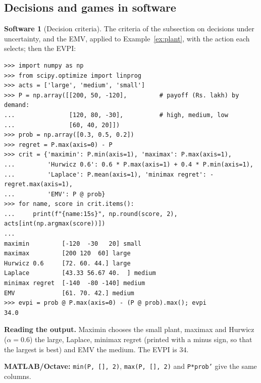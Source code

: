 \documentclass[11pt,a4paper]{article}
\numberwithin{equation}{section}
\theoremstyle{definition}
\newtheorem{software}[thm]{Software}
\begin{document}
\subsection{Decisions and games in software}
\label{ssec:software12}

\begin{software}[Decision criteria]
\label{sw:criteria}
The criteria of the subsection on decisions under uncertainty, and the EMV, applied to Example~\ref{ex:plant}, with the action each selects; then the EVPI:
{\small\begin{verbatim}
>>> import numpy as np
>>> from scipy.optimize import linprog
>>> acts = ['large', 'medium', 'small']
>>> P = np.array([[200, 50, -120],         # payoff (Rs. lakh) by demand:
...               [120, 80, -30],          # high, medium, low
...               [60, 40, 20]])
>>> prob = np.array([0.3, 0.5, 0.2])
>>> regret = P.max(axis=0) - P
>>> crit = {'maximin': P.min(axis=1), 'maximax': P.max(axis=1),
...         'Hurwicz 0.6': 0.6 * P.max(axis=1) + 0.4 * P.min(axis=1),
...         'Laplace': P.mean(axis=1), 'minimax regret': -regret.max(axis=1),
...         'EMV': P @ prob}
>>> for name, score in crit.items():
...     print(f"{name:15s}", np.round(score, 2), acts[int(np.argmax(score))])
...
maximin         [-120  -30   20] small
maximax         [200 120  60] large
Hurwicz 0.6     [72. 60. 44.] large
Laplace         [43.33 56.67 40.  ] medium
minimax regret  [-140  -80 -140] medium
EMV             [61. 70. 42.] medium
>>> evpi = prob @ P.max(axis=0) - (P @ prob).max(); evpi
34.0
\end{verbatim}}
\textbf{Reading the output.} Maximin chooses the small plant, maximax and Hurwicz ($\alpha = 0.6$) the large, Laplace, minimax regret (printed with a minus sign, so that the largest is best) and EMV the medium. The EVPI is $34$.

\textbf{MATLAB/Octave:} \texttt{min(P, [], 2)}, \texttt{max(P, [], 2)} and \texttt{P*prob'} give the same columns.
\end{software}
\end{document}
